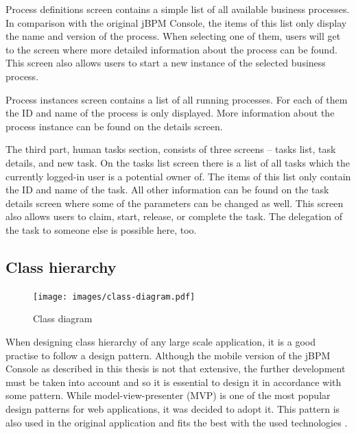 \documentclass[12pt,oneside,final]{fithesis2}
\begin{document}
Process definitions screen contains a simple list of all available business processes.
In comparison with the original jBPM Console, the items of this list only display the name and version of the process.
When selecting one of them, users will get to the screen where more detailed information about the process can be found.
This screen also allows users to start a new instance of the selected business process.

Process instances screen contains a list of all running processes.
For each of them the ID and name of the process is only displayed.
More information about the process instance can be found on the details screen.

The third part, human tasks section, consists of three screens -- tasks list, task details, and new task.
On the tasks list screen there is a list of all tasks which the currently logged-in user is a potential owner of\footnotemark{}.
The items of this list only contain the ID and name of the task.
All other information can be found on the task details screen where some of the parameters can be changed as well.
This screen also allows users to claim, start, release, or complete the task.
The delegation of the task to someone else is possible here, too.

\subsection{Class hierarchy}

\begin{figure}[ht!]
\centering
\texttt{[image: images/class-diagram.pdf]}
\caption{Class diagram}
\label{fig:class-diagram}
\end{figure}

When designing class hierarchy of any large scale application, it is a good practise to follow a design pattern.
Although the mobile version of the jBPM Console as described in this thesis is not that extensive, the further development must be taken into account and so it is essential to design it in accordance with some pattern.
While model-view-presenter (MVP) is one of the most popular design patterns for web applications, it was decided to adopt it.
This pattern is also used in the original application and fits the best with the used technologies \cite{ramsdale10}.
\end{document}
